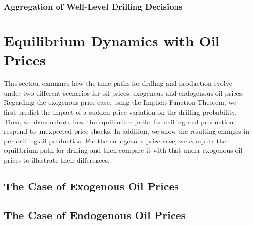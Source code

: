 \subsubsection{Aggregation of Well-Level Drilling Decisions}
\label{C3-SubSubSection:Aggregation-of-Well-Level-Drilling-Decisions}




\section{Equilibrium Dynamics with Oil Prices}
\label{C3-Section:Equilibrium-Dynamics-with-Oil-Prices}
This section examines how the time paths for drilling and production evolve under two different scenarios for oil prices: exogenous and endogenous oil prices. Regarding the exogenous-price case, using the Implicit Function Theorem, we first predict the impact of a sudden price variation on the drilling probability. Then, we demonstrate how the equilibrium paths for drilling and production respond to unexpected price shocks. In addition, we show the resulting changes in per-drilling oil production. For the endogenous-price case, we compute the equilibrium path for drilling and then compare it with that under exogenous oil prices to illustrate their differences. 

\subsection{The Case of Exogenous Oil Prices}
\label{C3-SubSection:The-Case-of-Exogenous-Oil-Prices}


\subsection{The Case of Endogenous Oil Prices}
\label{C3-SubSection:The-Case-of-Endogenous-Oil-Prices}




%



